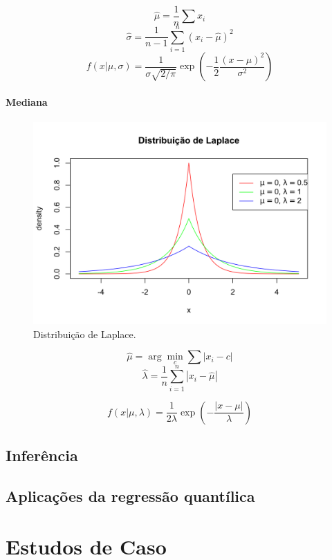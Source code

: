 \documentclass[a4paper, 12pt]{article}
\let\oldparagraph\paragraph
\renewcommand{\paragraph}[1]{\oldparagraph{#1}\mbox{}}
\begin{document}
\[\hat \mu = \frac{1}{n}\sum x_i\]
\[\hat \sigma = \frac{1}{n-1} \sum_{i=1}^n (x_i - \hat \mu)^2\]
\[f(x|\mu, \sigma) = \frac{1}{\sigma\sqrt{2/\pi}}\exp \left (-\frac{1}{2}\frac{(x - \mu)^2}{\sigma^2} \right )\]

\hypertarget{mediana}{%
\paragraph{Mediana}\label{mediana}}

\begin{figure}[H]

{\centering \includegraphics[width=0.7\linewidth]{images/dist_Laplace-1} 

}

\caption{Distribuição de Laplace.}\label{fig:dist_Laplace}
\end{figure}

\[\hat \mu = \arg\min_c \sum |x_i - c|\]
\[\hat \lambda = \frac{1}{n} \sum_{i=1}^n |x_i - \hat \mu|\]

\[f(x|\mu, \lambda) = \frac{1}{2 \lambda} \exp \left ( -\frac{|x - \mu|}{\lambda}\right )\]

\hypertarget{inferencia}{%
\subsection{Inferência}\label{inferencia}}

\hypertarget{aplicacoes-da-regressao-quantilica}{%
\subsection{Aplicações da regressão
quantílica}\label{aplicacoes-da-regressao-quantilica}}

\hypertarget{estudos-de-caso}{%
\section{Estudos de Caso}\label{estudos-de-caso}}
\end{document}
